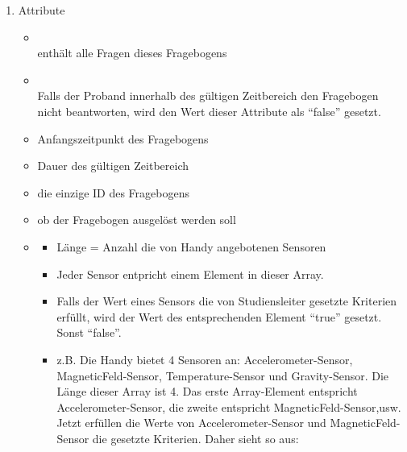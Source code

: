 \documentclass[a4paper]{scrreprt}
\begin{document}
{                    \begin{enumerate}
                        \item Attribute
                            \begin{itemize}
                                \item {\large {}}\\
                                    enthält alle Fragen dieses Fragebogens
                                \item {\large {}}\\
                                    Falls der Proband innerhalb des gültigen Zeitbereich den Fragebogen nicht beantworten, wird den Wert dieser Attribute als ``false'' gesetzt.
                                \item {\large {}}
                                    Anfangszeitpunkt des Fragebogens
                                \item {\large {}}
                                    Dauer des gültigen Zeitbereich
                                \item {\large {}}
                                    die einzige ID des Fragebogens
                                \item {\large {}}
                                    ob der Fragebogen ausgelöst werden soll
                                \item {\large {}}
                                    \begin{itemize}
                                        \item Länge = Anzahl die von Handy angebotenen Sensoren
                                        \item Jeder Sensor entpricht einem Element in dieser Array.
                                        \item Falls der Wert eines Sensors die von Studiensleiter gesetzte Kriterien erfüllt, wird der Wert des entsprechenden Element ``true'' gesetzt. Sonst ``false''.
                                        \item z.B. Die Handy bietet 4 Sensoren an: Accelerometer-Sensor, MagneticFeld-Sensor, Temperature-Sensor und Gravity-Sensor. Die Länge dieser Array ist 4. Das erste Array-Element entspricht Accelerometer-Sensor, die zweite entspricht MagneticFeld-Sensor,usw. Jetzt erfüllen die Werte von Accelerometer-Sensor und MagneticFeld-Sensor die gesetzte Kriterien. Daher sieht  so aus: \\



\end{itemize}
\end{itemize}
\end{enumerate}}
\end{document}
